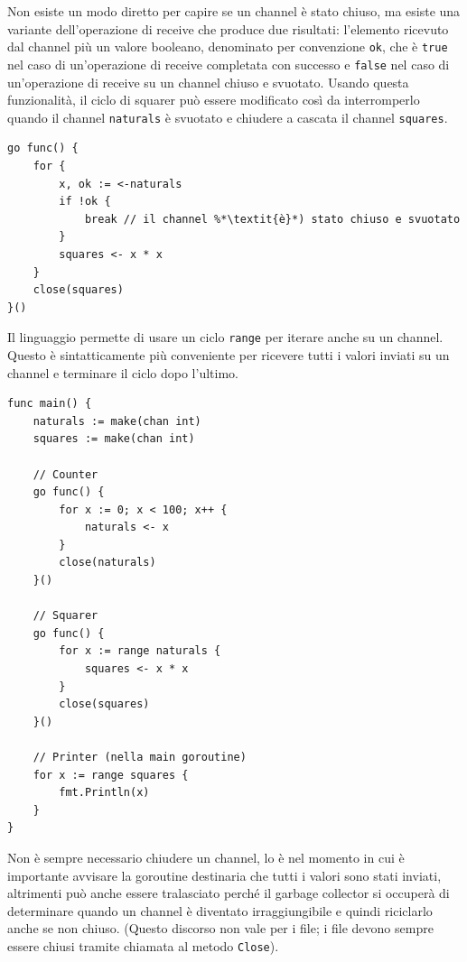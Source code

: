 \documentclass[../../../thesis.tex]{subfiles}
\begin{document}
    Non esiste un modo diretto per capire se un channel è stato chiuso, ma esiste una variante dell'operazione di receive che produce due risultati: l'elemento ricevuto dal channel più un valore booleano, denominato per convenzione \verb"ok", che è \verb"true" nel caso di un'operazione di receive completata con successo e \verb"false" nel caso di un'operazione di receive su un channel chiuso e svuotato.
    Usando questa funzionalità, il ciclo di squarer può essere modificato così da interromperlo quando il channel \verb"naturals" è svuotato e chiudere a cascata il channel \verb"squares".
    \begin{lstlisting}[frame = single, label = {lst:lstlisting7-4-2.3}]
go func() {
    for {
        x, ok := <-naturals
        if !ok {
            break // il channel %*\textit{è}*) stato chiuso e svuotato
        }
        squares <- x * x
    }
    close(squares)
}()
    \end{lstlisting}
    Il linguaggio permette di usare un ciclo \verb"range" per iterare anche su un channel.
    Questo è sintatticamente più conveniente per ricevere tutti i valori inviati su un channel e terminare il ciclo dopo l'ultimo.
    \begin{lstlisting}[frame = single, label = {lst:lstlisting7-4-2.4}]
func main() {
    naturals := make(chan int)
    squares := make(chan int)

    // Counter
    go func() {
        for x := 0; x < 100; x++ {
            naturals <- x
        }
        close(naturals)
    }()

    // Squarer
    go func() {
        for x := range naturals {
            squares <- x * x
        }
        close(squares)
    }()

    // Printer (nella main goroutine)
    for x := range squares {
        fmt.Println(x)
    }
}
    \end{lstlisting}
    Non è sempre necessario chiudere un channel, lo è nel momento in cui è importante avvisare la goroutine destinaria che tutti i valori sono stati inviati, altrimenti può anche essere tralasciato perché il garbage collector si occuperà di determinare quando un channel è diventato irraggiungibile e quindi riciclarlo anche se non chiuso. (Questo discorso non vale per i file;
    i file devono sempre essere chiusi tramite chiamata al metodo \verb"Close").
\end{document}
